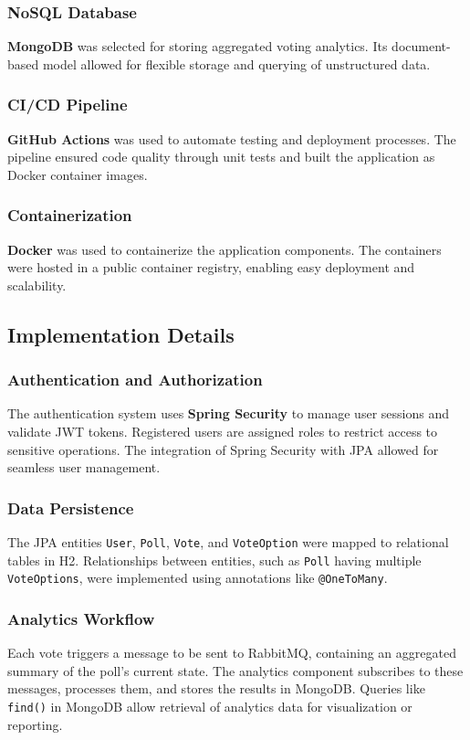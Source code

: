 \subsubsection{NoSQL Database}
\textbf{MongoDB} was selected for storing aggregated voting analytics. Its document-based model allowed for flexible storage and querying of unstructured data.

\subsubsection{CI/CD Pipeline}
\textbf{GitHub Actions} was used to automate testing and deployment processes. The pipeline ensured code quality through unit tests and built the application as Docker container images.

\subsubsection{Containerization}
\textbf{Docker} was used to containerize the application components. The containers were hosted in a public container registry, enabling easy deployment and scalability.

\subsection{Implementation Details}
\subsubsection{Authentication and Authorization}
The authentication system uses \textbf{Spring Security} to manage user sessions and validate JWT tokens. Registered users are assigned roles to restrict access to sensitive operations. The integration of Spring Security with JPA allowed for seamless user management.

\subsubsection{Data Persistence}
The JPA entities \texttt{User}, \texttt{Poll}, \texttt{Vote}, and \texttt{VoteOption} were mapped to relational tables in H2. Relationships between entities, such as \texttt{Poll} having multiple \texttt{VoteOptions}, were implemented using annotations like \texttt{@OneToMany}.

\subsubsection{Analytics Workflow}
Each vote triggers a message to be sent to RabbitMQ, containing an aggregated summary of the poll's current state. The analytics component subscribes to these messages, processes them, and stores the results in MongoDB. Queries like \texttt{find()} in MongoDB allow retrieval of analytics data for visualization or reporting.

